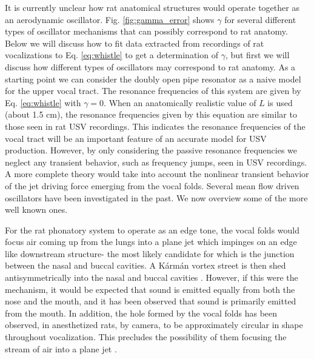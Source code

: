 \documentclass[superscriptaddress, twocolumn, prl]{revtex4}
\begin{document}
It is currently unclear how rat anatomical structures would operate together as an aerodynamic oscillator. Fig. \ref{fig:gamma_error} shows $\gamma$ for several different types of oscillator mechanisms that can possibly correspond to rat anatomy. Below we will discuss how to fit data extracted from recordings of rat vocalizations to Eq. \ref{eq:whistle} to get a determination of $\gamma$, but first we will discuss how different types of oscillators may correspond to rat anatomy. As a starting point we can consider the doubly open pipe resonator as a naive model for the upper vocal tract. The resonance frequencies of this system are given by Eq. \ref{eq:whistle} with $\gamma=0$. When an anatomically realistic value of $L$ is used (about 1.5 cm), the resonance frequencies given by this equation are similar to those seen in rat USV recordings. This indicates the resonance frequencies of the vocal tract will be an important feature of an accurate model for USV production. However, by only considering the passive resonance frequencies we neglect any transient behavior, such as frequency jumps, seen in USV recordings. A more complete theory would take into account the nonlinear transient behavior of the jet driving force emerging from the vocal folds. Several mean flow driven oscillators have been investigated in the past. We now overview some of the more well known ones.

For the rat phonatory system to operate as an edge tone, the vocal folds would focus air coming up from the lungs into a plane jet which impinges on an edge like downstream structure- the most likely candidate for which is the junction between the nasal and buccal cavities. A K\'{a}rm\'{a}n vortex street is then shed antisymmetrically into the nasal and buccal cavities \cite{Holger1977,Howe2008}. However, if this were the mechanism, it would be expected that sound is emitted equally from both the nose and the mouth, and it has been observed that sound is primarily emitted from the mouth. In addition, the hole formed by the vocal folds has been observed, in anesthetized rats, by camera, to be approximately circular in shape throughout vocalization. This precludes the possibility of them focusing the stream of air into a plane jet \cite{Brudzynski2010}.  
\end{document}
